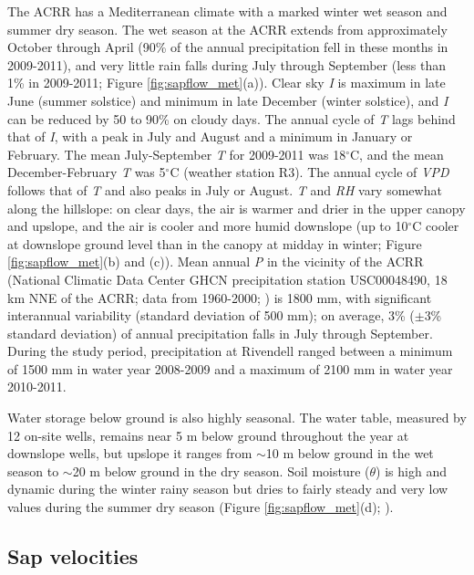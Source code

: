 The ACRR has a Mediterranean climate with a marked winter wet season and summer dry season.  The wet season at the ACRR extends from approximately October through April (90\% of the annual precipitation fell in these months in 2009-2011), and very little rain falls during July through September (less than 1\% in 2009-2011; Figure \ref{fig:sapflow_met}(a)).  Clear sky \textit{I} is maximum in late June (summer solstice) and minimum in late December (winter solstice), and \textit{I} can be reduced by 50 to 90\% on cloudy days.  The annual cycle of \textit{T} lags behind that of \textit{I}, with a peak in July and August and a minimum in January or February. The mean July-September \textit{T} for 2009-2011 was 18$^{\circ}$C, and the mean December-February \textit{T} was 5$^{\circ}$C (weather station R3).  The annual cycle of \textit{VPD} follows that of \textit{T} and also peaks in July or August.  \textit{T} and \textit{RH} vary somewhat along the hillslope: on clear days, the air is warmer and drier in the upper canopy and upslope, and the air is cooler and more humid downslope (up to 10$^{\circ}$C cooler at downslope ground level than in the canopy at midday in winter; Figure \ref{fig:sapflow_met}(b) and (c)).  Mean annual \textit{P} in the vicinity of the ACRR (National Climatic Data Center GHCN precipitation station USC00048490, 18 km NNE of the ACRR; data from 1960-2000; \cite{williams2012modifications}) is 1800 mm, with significant interannual variability (standard deviation of 500 mm); on average, 3\% ($\pm$3\% standard deviation) of annual precipitation falls in July through September.  During the study period, precipitation at Rivendell ranged between a minimum of 1500 mm in water year 2008-2009 and a maximum of 2100 mm in water year 2010-2011.

Water storage below ground is also highly seasonal. The water table, measured by 12 on-site wells, remains near 5 m below ground throughout the year at downslope wells, but upslope it ranges from $\sim$10 m below ground in the wet season to $\sim$20 m below ground in the dry season.   Soil moisture ($\theta$) is high and dynamic during the winter rainy season but dries to fairly steady and very low values during the summer dry season (Figure \ref{fig:sapflow_met}(d); \cite{salve2012rain}).  

\subsection{Sap velocities}

